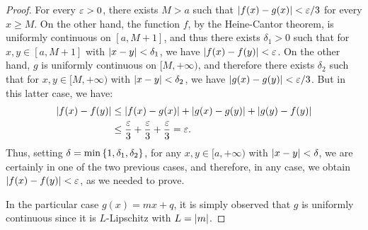 \begin{proof}
For every $\varepsilon>0$, there exists $M>a$ such that ${\left|f(x)-g(x)\right|} < \varepsilon/3$ for
every $x\ge M$. On the other hand, the function $f$, by the Heine-Cantor
theorem, is uniformly continuous on $[a,M+1]$, and thus there exists
$\delta_1>0$ such that for $x,y \in [a,M+1]$ with ${\left|x-y\right|}< \delta_1$, we have
${\left|f(x)-f(y)\right|} < \varepsilon$. On the other hand, $g$ is uniformly continuous on
$[M,+\infty)$, and therefore there exists $\delta_2$ such that for $x,y\in
[M,+\infty)$ with ${\left|x-y\right|} < \delta_2$, we have ${\left|g(x)-g(y)\right|} < \varepsilon/3$.
But in this latter case, we have:
\begin{align*}
  {\left|f(x)-f(y)\right|} &\le {\left|f(x) - g(x)\right|} + {\left|g(x) - g(y)\right|} + {\left|g(y)-f(y)\right|} \\
  & \le \frac{\varepsilon}{3} + \frac{\varepsilon}{3} + \frac{\varepsilon}{3} = \varepsilon.
\end{align*}
Thus, setting $\delta = \min{\left\{ 1, \delta_1, \delta_2 \right\}}$, for any $x,y\in
[a,+\infty)$ with ${\left|x-y\right|}< \delta$, we are certainly in one of the two
previous cases, and therefore, in any case, we obtain ${\left|f(x)-f(y)\right|} < \varepsilon$,
as we needed to prove.

In the particular case $g(x) = mx +q$, it is simply observed that $g$ is
uniformly continuous since it is $L$-Lipschitz with $L={\left|m\right|}$.
\end{proof}